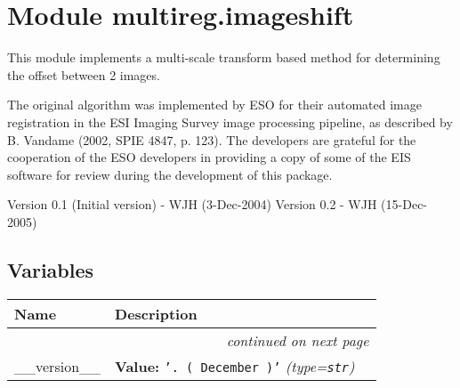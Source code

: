 %
%
%


\section{Module multireg.imageshift}

    \label{multireg:imageshift}
This module implements a multi-scale transform based method for 
determining the offset between 2 images.

The original algorithm was implemented by ESO for their automated image 
registration in the ESI Imaging Survey image processing pipeline, as 
described by B. Vandame (2002, SPIE 4847, p. 123). The developers are 
grateful for the cooperation of the ESO developers in providing a copy of 
some of the EIS software for review during the development of this 
package.

Version 0.1 (Initial version) - WJH (3-Dec-2004) Version 0.2 - WJH 
(15-Dec-2005)



  \subsection{Variables}

\begin{longtable}{|p{}|p{}|l}
\cline{1-2}
\cline{1-2} \centering \textbf{Name} & \centering \textbf{Description}& \\
\cline{1-2}
\endhead\cline{1-2}\multicolumn{3}{r}{\small\textit{continued on next page}}\\\endfoot\cline{1-2}
\endlastfoot\raggedright \_\-\_\-v\-e\-r\-s\-i\-o\-n\-\_\-\_\- & \raggedright \textbf{Value:} 
{\tt '\-0\-.\-2\-~\-(\-1\-5\-~\-D\-e\-c\-e\-m\-b\-e\-r\-~\-2\-0\-0\-5\-)\-'\-}            \textit{(type=\texttt{str})}&\\
\cline{1-2}
\end{longtable}

